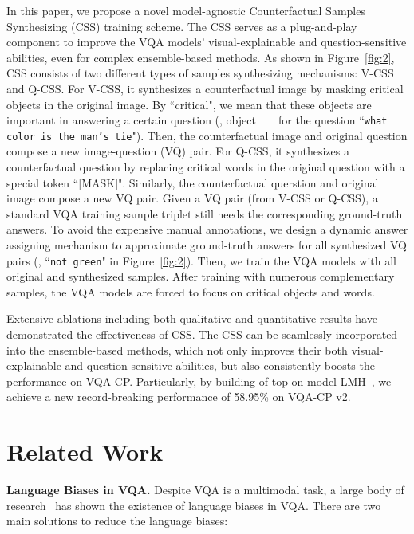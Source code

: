 \documentclass[10pt,twocolumn,letterpaper]{article}
\newcommand*\inlineimage[1]{\raisebox{-0.14\baselineskip}{\texttt{[image: \#1]}}}
\newcommand{\tieimg}{\inlineimage{figures/tie.jpg}}
\begin{document}
In this paper, we propose a novel model-agnostic Counterfactual Samples Synthesizing (CSS) training scheme. The CSS serves as a plug-and-play component to improve the VQA models' visual-explainable and question-sensitive abilities, even for complex ensemble-based methods. As shown in Figure~\ref{fig:2}, CSS consists of two different types of samples synthesizing mechanisms: V-CSS and Q-CSS. For V-CSS, it synthesizes a counterfactual image by masking critical objects in the original image. By ``critical", we mean that these objects are important in answering a certain question (\eg, object~~\tieimg~~for the question ``\texttt{what color is the man's tie}"). Then, the counterfactual image and original question compose a new image-question (VQ) pair. For Q-CSS, it synthesizes a counterfactual question by replacing critical words in the original question with a special token ``[MASK]". Similarly, the counterfactual querstion and original image compose a new VQ pair. Given a VQ pair (from V-CSS or Q-CSS), a standard VQA training sample triplet still needs the corresponding ground-truth answers. To avoid the expensive manual annotations, we design a dynamic answer assigning mechanism to approximate ground-truth answers for all synthesized VQ pairs (\eg, ``\texttt{not green}" in Figure~\ref{fig:2}). Then, we train the VQA models with all original and synthesized samples. After training with numerous complementary samples, the VQA models are forced to focus on critical objects and words.

Extensive ablations including both qualitative and quantitative results have demonstrated the effectiveness of CSS. The CSS can be seamlessly incorporated into the ensemble-based methods, which not only improves their both visual-explainable and question-sensitive abilities, but also consistently boosts the performance on VQA-CP. Particularly, by building of top on model LMH~\cite{clark2019don}, we achieve a new record-breaking performance of 58.95\% on VQA-CP v2.


\section{Related Work}

\textbf{Language Biases in VQA.}
Despite VQA is a multimodal task, a large body of research~\cite{jabri2016revisiting, agrawal2016analyzing, zhang2016yin, goyal2017making} has shown the existence of language biases in VQA. There are two main solutions to reduce the language biases:
\end{document}
